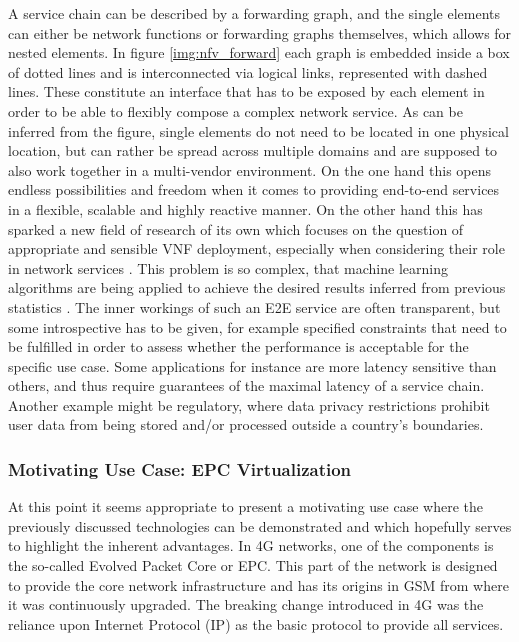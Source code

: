 A service chain can be described by a forwarding graph, and the single elements can either be network functions or forwarding graphs themselves, which allows for nested elements. In figure \ref{img:nfv_forward} each graph is embedded inside a box of dotted lines and is interconnected via logical links, represented with dashed lines. These constitute an interface that has to be exposed by each element in order to be able to flexibly compose a complex network service. As can be inferred from the figure, single elements do not need to be located in one physical location, but can rather be spread across multiple domains and are supposed to also work together in a multi-vendor environment. On the one hand this opens endless possibilities and freedom when it comes to providing end-to-end services in a flexible, scalable and highly reactive manner. On the other hand this has sparked a new field of research of its own which focuses on the question of appropriate and sensible VNF deployment, especially when considering their role in network services \cite{place1} \cite{place2} \cite{place3}. This problem is so complex, that machine learning algorithms are being applied to achieve the desired results inferred from previous statistics \cite{placeml1} \cite{placeml2}. The inner workings of such an E2E service are often transparent, but some introspective has to be given, for example specified constraints that need to be fulfilled in order to assess whether the performance is acceptable for the specific use case. Some applications for instance are more latency sensitive than others, and thus require guarantees of the maximal latency of a service chain. Another example might be regulatory, where data privacy restrictions prohibit user data from being stored and/or processed outside a country's boundaries. 

\subsubsection{Motivating Use Case: EPC Virtualization}
At this point it seems appropriate to present a motivating use case where the previously discussed technologies can be demonstrated and which hopefully serves to highlight the inherent advantages. In 4G networks, one of the components is the so-called Evolved Packet Core or EPC. This part of the network is designed to provide the core network infrastructure and has its origins in GSM from where it was continuously upgraded. The breaking change introduced in 4G was the reliance upon Internet Protocol (IP) as the basic protocol to provide all services. 

